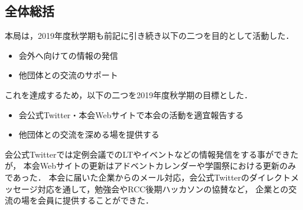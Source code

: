 \subsection*{全体総括}


本局は，2019年度秋学期も前記に引き続き以下の二つを目的として活動した．
\begin{itemize}
	\item 会外へ向けての情報の発信
	\item 他団体との交流のサポート
\end{itemize}
これを達成するため，以下の二つを2019年度秋学期の目標とした．
\begin{itemize}
	\item 会公式Twitter・本会Webサイトで本会の活動を適宜報告する
	\item 他団体との交流を深める場を提供する
\end{itemize}

会公式Twitterでは定例会議でのLTやイベントなどの情報発信をする事ができたが，
本会Webサイトの更新はアドベントカレンダーや学園祭における更新のみであった．
本会に届いた企業からのメール対応，会公式Twitterのダイレクトメッセージ対応を通して，勉強会やRCC後期ハッカソンの協賛など，
企業との交流の場を会員に提供することができた．
